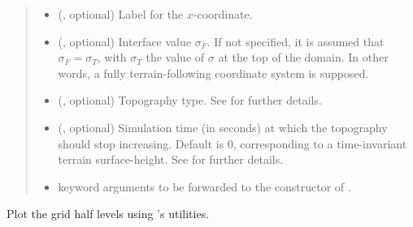 \documentclass[letterpaper,10pt,english]{sphinxmanual}
\begin{document}
\begin{fulllineitems}
\begin{fulllineitems}
\begin{quote}
\begin{description}
\begin{itemize}
\item {} 
 (, optional) \textendash{} Label for the \(x\)-coordinate.

\item {} 
 (, optional) \textendash{} Interface value \(\sigma_F\). If not specified,
it is assumed that \(\sigma_F = \sigma_T\), with \(\sigma_T\) the value
of \(\sigma\) at the top of the domain. In other words, a fully terrain-following
coordinate system is supposed.

\item {} 
 (, optional) \textendash{} Topography type. See {\hyperref[\detokenize{api:module-grids.topography}]{}}
for further details.

\item {} 
 (, optional) \textendash{} Simulation time (in seconds) at which the topography
should stop increasing. Default is 0, corresponding to a time-invariant terrain
surface-height. See  for further details.

\item {} 
 \textendash{} keyword arguments to be forwarded to the constructor of
{\hyperref[\detokenize{api:grids.topography.Topography1d}]{}}.

\end{itemize}

\end{description}\end{quote}

\end{fulllineitems}


\begin{fulllineitems}
\label{\detokenize{api:grids.sigma.Sigma2d.plot}}
Plot the grid half levels using ’s utilities.


\end{fulllineitems}
\end{fulllineitems}
\end{document}
